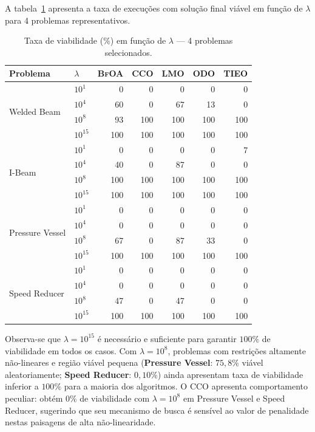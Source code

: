 \documentclass[12pt, a4paper]{article}
\newcommand{\alg}[1]{\textsc{#1}}
\begin{document}
A tabela~\ref{tab:lambda} apresenta a taxa de execuções com solução
final viável em função de $\lambda$ para 4 problemas representativos.

\begin{table}[h!]
\centering
\caption{Taxa de viabilidade (\%) em função de $\lambda$ — 4 problemas
  selecionados.}
\label{tab:lambda}
\small
\begin{tabular}{llrrrrr}
\toprule
Problema & $\lambda$ & \alg{BfOA} & \alg{CCO} & \alg{LMO} & \alg{ODO} & \alg{TIEO} \\
\midrule
\multirow{4}{*}{Welded Beam}
 & $10^1$  & 0 & 0 & 0 & 0 & 0 \\
 & $10^4$  & 60 & 0 & 67 & 13 & 0 \\
 & $10^8$  & 93 & 100 & 100 & 100 & 100 \\
 & $10^{15}$ & 100 & 100 & 100 & 100 & 100 \\
\midrule
\multirow{4}{*}{I-Beam}
 & $10^1$  & 0 & 0 & 0 & 0 & 7 \\
 & $10^4$  & 40 & 0 & 87 & 0 & 0 \\
 & $10^8$  & 100 & 100 & 100 & 100 & 100 \\
 & $10^{15}$ & 100 & 100 & 100 & 100 & 100 \\
\midrule
\multirow{4}{*}{Pressure Vessel}
 & $10^1$  & 0 & 0 & 0 & 0 & 0 \\
 & $10^4$  & 0 & 0 & 0 & 0 & 0 \\
 & $10^8$  & 67 & 0 & 87 & 33 & 0 \\
 & $10^{15}$ & 100 & 100 & 100 & 100 & 100 \\
\midrule
\multirow{4}{*}{Speed Reducer}
 & $10^1$  & 0 & 0 & 0 & 0 & 0 \\
 & $10^4$  & 0 & 0 & 0 & 0 & 0 \\
 & $10^8$  & 47 & 0 & 47 & 0 & 0 \\
 & $10^{15}$ & 100 & 100 & 100 & 100 & 100 \\
\bottomrule
\end{tabular}
\end{table}

Observa-se que $\lambda = 10^{15}$ é necessário e suficiente para
garantir $100\%$ de viabilidade em todos os casos. Com $\lambda = 10^8$,
problemas com restrições altamente não-lineares e região viável pequena
(\textbf{Pressure Vessel}: $75{,}8\%$ viável aleatoriamente;
\textbf{Speed Reducer}: $0{,}10\%$) ainda apresentam taxa de
viabilidade inferior a $100\%$ para a maioria dos algoritmos.
O \alg{CCO} apresenta comportamento peculiar: obtém $0\%$ de
viabilidade com $\lambda = 10^8$ em Pressure Vessel e Speed Reducer,
sugerindo que seu mecanismo de busca é sensível ao valor de penalidade
nestas paisagens de alta não-linearidade.
\end{document}
